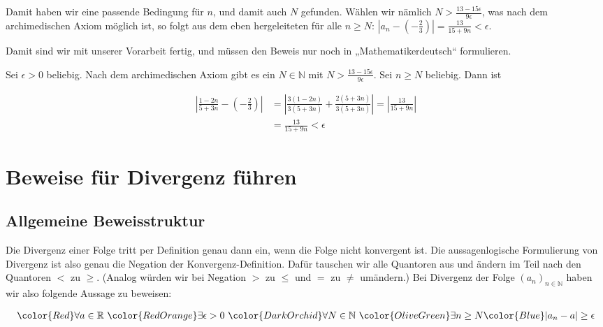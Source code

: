 \documentclass[fontsize=9pt,
               parskip=half-,
               DIV=14,
               listof=chapterentry,
               tocflat]{scrbook}
\newenvironment{indentblock}{\begin{adjustwidth}{.5cm}{}}{\end{adjustwidth}}
\begin{document}
\begin{solutionprocess*}
\begin{indentblock}
Damit haben wir eine passende Bedingung für $n$, und damit auch $N$ gefunden. Wählen wir nämlich $N>{\tfrac {13-15\epsilon }{9\epsilon }}$, was nach dem archimedischen Axiom möglich ist, so folgt aus dem eben hergeleiteten für alle $n\geq N$: $|a_{n}-(-{\tfrac {2}{3}})|={\tfrac {13}{15+9n}}<\epsilon $.

\end{indentblock}

Damit sind wir mit unserer Vorarbeit fertig, und müssen den Beweis nur noch in „Mathematikerdeutsch“ formulieren.

\end{solutionprocess*}

\begin{proof*}
Sei $\epsilon >0$ beliebig. Nach dem archimedischen Axiom gibt es ein $N\in \mathbb {N} $ mit $N>{\tfrac {13-15\epsilon }{9\epsilon }}$. Sei $n\geq N$ beliebig. Dann ist

\begin{align*}
\left|{\frac {1-2n}{5+3n}}-\left(-{\frac {2}{3}}\right)\right|&=\left|{\frac {3(1-2n)}{3(5+3n)}}+{\frac {2(5+3n)}{3(5+3n)}}\right|=\left|{\frac {13}{15+9n}}\right|\\[0.5em]&={\frac {13}{15+9n}}<\epsilon 
\end{align*}

\end{proof*}

\section{Beweise für Divergenz führen}

\subsection{Allgemeine Beweisstruktur}

Die Divergenz einer Folge tritt per Definition genau dann ein, wenn die Folge nicht konvergent ist. Die aussagenlogische Formulierung von Divergenz ist also genau die Negation der Konvergenz-Definition. Dafür tauschen wir alle Quantoren aus und ändern im Teil nach den Quantoren $<$ zu $\geq $. (Analog würden wir bei Negation $>$ zu $\leq $ und $=$ zu $\neq $ umändern.) Bei Divergenz der Folge $(a_{n})_{n\in \mathbb {N} }$ haben wir also folgende Aussage zu beweisen:

\begin{align*}
{\color {Red}\forall a\in \mathbb {R} }\ {\color {RedOrange}\exists \epsilon >0}\ {\color {DarkOrchid}\forall N\in \mathbb {N} }\ {\color {OliveGreen}\exists n\geq N}{\color {Blue}|a_{n}-a|\geq \epsilon }
\end{align*}
\end{document}
